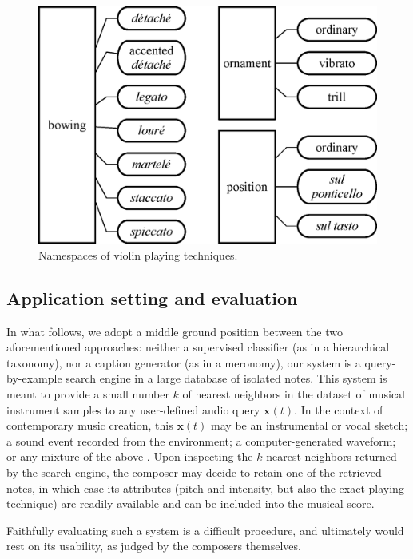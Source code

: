 \documentclass{article}
\begin{document}
\begin{figure}
\centering
\includegraphics[width=\linewidth]{./figs/dendrograms/technique-dendrogram.eps}
\caption{Namespaces of violin playing techniques.}
\label{fig:technique-dendrogram}
\end{figure}


\subsection{Application setting and evaluation} \label{sec:motivation}

In what follows, we adopt a middle ground position between the two aforementioned approaches: neither a supervised classifier (as in a hierarchical taxonomy), nor a caption generator (as in a meronomy), our system is a query-by-example search engine in a large database of isolated notes.
This system is meant to provide a small number $k$ of nearest neighbors in the dataset of musical instrument samples to any user-defined audio query $\boldsymbol{x}(t)$.
In the context of contemporary music creation, this $\boldsymbol{x}(t)$ may be an instrumental or vocal sketch; a sound event recorded from the environment; a computer-generated waveform; or any mixture of the above \cite{maresz2013cmr}.
Upon inspecting the $k$ nearest neighbors returned by the search engine, the composer may decide to retain one of the retrieved notes, in which case its attributes (pitch and intensity, but also the exact playing technique) are readily available and can be included into the musical score.


Faithfully evaluating such a system is a difficult procedure, and ultimately would rest on its usability, as judged by the composers themselves.
\end{document}
